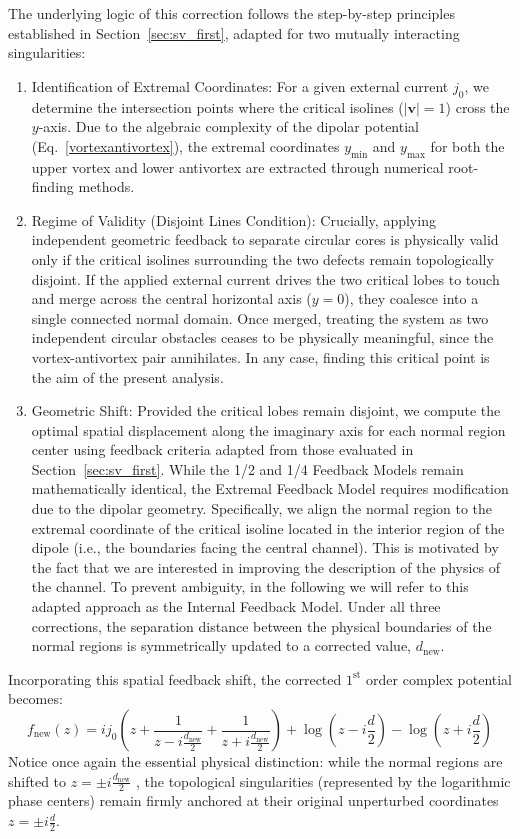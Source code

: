\documentclass[english,binding=0.6cm,noexaminfo]{sapthesis}
\begin{document}
The underlying logic of this correction follows the step-by-step principles established in Section~\ref{sec:sv_first}, adapted for two mutually interacting singularities:
\begin{enumerate}
    \item Identification of Extremal Coordinates: For a given external current $j_0$, we determine the intersection points where the critical isolines ($|\mathbf{v}| = 1$) cross the $y$-axis. Due to the algebraic complexity of the dipolar potential (Eq.~\eqref{vortexantivortex}), the extremal coordinates $y_{\text{min}}$ and $y_{\text{max}}$ for both the upper vortex and lower antivortex are extracted through numerical root-finding methods.
    \item Regime of Validity (Disjoint Lines Condition): Crucially, applying independent geometric feedback to separate circular cores is physically valid only if the critical isolines surrounding the two defects remain topologically disjoint. If the applied external current drives the two critical lobes to touch and merge across the central horizontal axis ($y=0$), they coalesce into a single connected normal domain. Once merged, treating the system as two independent circular obstacles ceases to be physically meaningful, since the vortex-antivortex pair annihilates. In any case, finding this critical point is the aim of the present analysis.
    \item Geometric Shift: Provided the critical lobes remain disjoint, we compute the optimal spatial displacement along the imaginary axis for each normal region center using feedback criteria adapted from those evaluated in Section~\ref{sec:sv_first}. While the 1/2 and 1/4 Feedback Models remain mathematically identical, the Extremal Feedback Model requires modification due to the dipolar geometry. Specifically, we align the normal region to the extremal coordinate of the critical isoline located in the interior region of the dipole (i.e., the boundaries facing the central channel). This is motivated by the fact that we are interested in improving the description of the physics of the channel. To prevent ambiguity, in the following we will refer to this adapted approach as the Internal Feedback Model. Under all three corrections, the separation distance between the physical boundaries of the normal regions is symmetrically updated to a corrected value, $d_{\text{new}}$.
\end{enumerate}

Incorporating this spatial feedback shift, the corrected $1^{\text{st}}$ order complex potential becomes:
\begin{equation}
    f_{\text{new}}(z) = ij_0 \left( z + \frac{1}{z - i \frac{d_{\text{new}}}{2}} + \frac{1}{z + i \frac{d_{\text{new}}}{2}} \right) + \log\left(z - i \frac{d}{2}\right) - \log\left(z + i \frac{d}{2}\right)
\label{eq:dipole_first_order_pot}
\end{equation}
Notice once again the essential physical distinction: while the normal regions are shifted to $z = \pm i \frac{d_{\text{new}}}{2}$ , the topological singularities (represented by the logarithmic phase centers) remain firmly anchored at their original unperturbed coordinates $z = \pm i \frac{d}{2}$.
\end{document}
